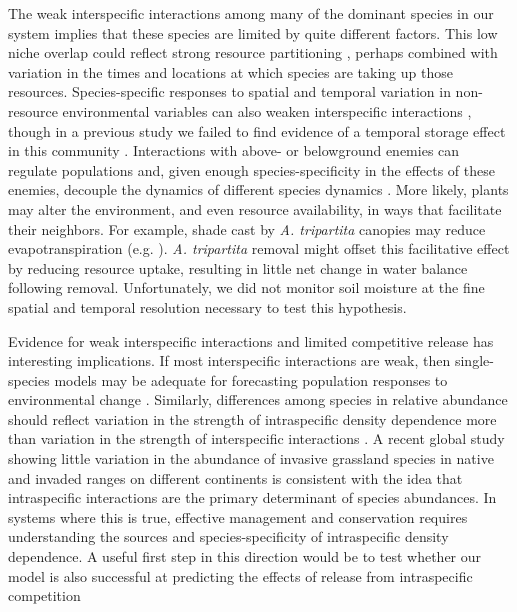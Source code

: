 \documentclass[11pt]{article}
\begin{document}
\begin{doublespacing}
The weak interspecific interactions among many of the dominant species in our system implies that these species  
are limited by quite different factors. This low niche overlap could reflect strong resource partitioning \citep{tilman_resource_1982}, 
perhaps combined with variation in the times and locations at which species are taking up those resources. 
Species-specific responses to spatial and temporal variation in non-resource environmental variables can also weaken interspecific 
interactions \citep{chesson_mechanisms_2000}, though in a previous study we failed to find evidence of a temporal storage effect 
in this community \citep{adler_weak_2009}. Interactions with above- or belowground enemies can regulate populations and, given 
enough species-specificity in the effects of these enemies, decouple the dynamics of different species dynamics \citep{hersh_evaluating_2011,
janzen_herbivores_1970,connell_role_1971}.  More likely, plants may alter the environment, and even resource availability, 
in ways that facilitate their neighbors. For example, shade cast by \textit{A. tripartita} canopies may reduce 
evapotranspiration (e.g. \citealt{Barbier2008}). \textit{A. tripartita} removal might offset this facilitative effect by reducing 
resource uptake, resulting in little net change in water balance following removal. 
Unfortunately, we did not monitor soil moisture at the fine spatial and temporal resolution necessary to test this hypothesis.

Evidence for weak interspecific interactions and limited competitive release has interesting implications. If most 
interspecific interactions are weak, then single-species models may be adequate for forecasting population responses 
to environmental change \citep{adler_forecasting_2012,kleinhesselink_indirect_2015,Chu2016}. Similarly, differences among 
species in relative abundance should reflect variation in the strength of intraspecific density dependence more than 
variation in the strength of interspecific interactions \citep{yenni_strong_2012}. A recent global study showing little 
variation in the abundance of invasive grassland species in native and invaded ranges on different 
continents  \citep{firn_abundance_2011} is consistent with the idea that intraspecific interactions are the primary determinant 
of species abundances. In systems where this is true, effective management and conservation requires understanding the sources 
and species-specificity of intraspecific density dependence. A useful first step in this direction would be to test 
whether our model is also successful at predicting the effects of release from intraspecific competition


\end{doublespacing}
\end{document}
